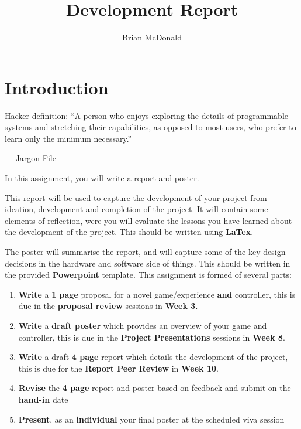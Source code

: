 \documentclass{../../fal_assignment}
\title{Development Report}
\author{Brian McDonald}
\begin{document}
\maketitle

\section*{Introduction}

\begin{marginquote}
Hacker definition: ``A person who enjoys exploring the details of programmable systems and stretching their capabilities, as opposed to most users, who prefer to learn only the minimum necessary.''

--- Jargon File

\end{marginquote}

In this assignment, you will write a report and poster. 

This report will be used to capture the development of your project from ideation, development and completion of the project. It will contain some elements of reflection, were you will evaluate the lessons you have learned about the development of the project. This should be written using \textbf{LaTex}.

The poster will summarise the report, and will capture some of the key design decisions in the hardware and software side of things. This should be written in the provided \textbf{Powerpoint} template.
This assignment is formed of several parts:

\begin{enumerate}[label=(\Alph*)]
    \item \textbf{Write} a \textbf{1 page} proposal for a novel game/experience \textbf{and} controller, this is due in the \textbf{proposal review} sessions in \textbf{Week 3}. 
	\item \textbf{Write} a \textbf{draft poster} which provides an overview of your game and controller, this is due in the \textbf{Project Presentations} sessions in \textbf{Week 8}. 
	\item \textbf{Write} a draft \textbf{4 page} report which details the development of the project, this is due for the \textbf{Report Peer Review} in \textbf{Week 10}. 
	\item \textbf{Revise} the \textbf{4 page} report and poster based on feedback and submit on the  \textbf{hand-in} date
	\item \textbf{Present}, as an \textbf{individual} your final poster at the scheduled viva session
\end{enumerate}
\end{document}
